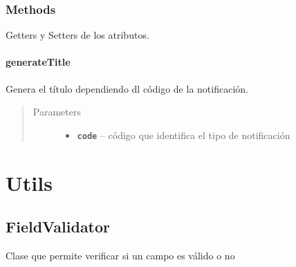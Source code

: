 \documentclass[letterpaper,10pt,english]{sphinxmanual}
\begin{document}
\subsection{Methods}
\label{Model/Notification:methods}
Getters y Setters de los atributos.


\subsubsection{generateTitle}
\label{Model/Notification:generatetitle}

\begin{fulllineitems}
\label{Model/Notification:com.fiuba.tallerii.jobify.Notification.generateTitle(int)}
Genera el título dependiendo dl código de la notificación.
\begin{quote}\begin{description}
\item[{Parameters}] \leavevmode\begin{itemize}
\item {} 
\textbf{\texttt{code}} -- código que identifica el tipo de notificación

\end{itemize}

\end{description}\end{quote}

\end{fulllineitems}



\chapter{Utils}
\label{Utils/package-index:utils}\label{Utils/package-index::doc}

\section{FieldValidator}
\label{Utils/FieldValidator:fieldvalidator}\label{Utils/FieldValidator::doc}

\begin{fulllineitems}
\label{Utils/FieldValidator:com.fiuba.tallerii.jobify.FieldValidator}
Clase que permite verificar si un campo es válido o no

\end{fulllineitems}
\end{document}
